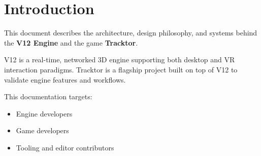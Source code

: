 \section{Introduction}

This document describes the architecture, design philosophy, and systems
behind the \textbf{V12 Engine} and the game \textbf{Tracktor}.

V12 is a real-time, networked 3D engine supporting both desktop and VR
interaction paradigms. Tracktor is a flagship project built on top of V12
to validate engine features and workflows.

This documentation targets:
\begin{itemize}
	\item Engine developers
	\item Game developers
	\item Tooling and editor contributors
\end{itemize}
